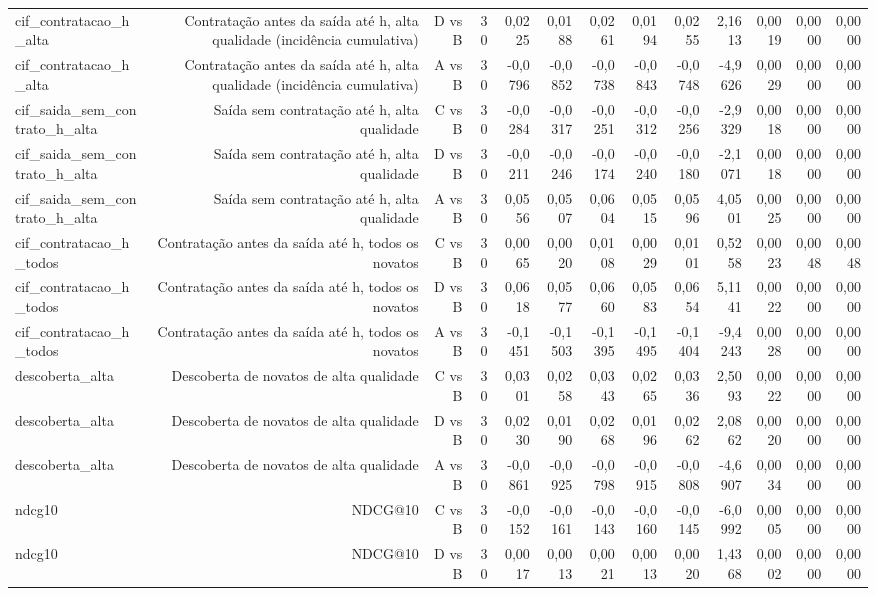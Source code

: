 \begin{table}[ht]
\begin{tabular}{lrrrrrrrrrrrr}
cif\_contratacao\_h\_alta & Contratação antes da saída até h, alta qualidade (incidência cumulativa) & D vs B & 30 & 0,0225 & 0,0188 & 0,0261 & 0,0194 & 0,0255 & 2,1613 & 0,0019 & 0,0000 & 0,0000 \\
cif\_contratacao\_h\_alta & Contratação antes da saída até h, alta qualidade (incidência cumulativa) & A vs B & 30 & -0,0796 & -0,0852 & -0,0738 & -0,0843 & -0,0748 & -4,9626 & 0,0029 & 0,0000 & 0,0000 \\
cif\_saida\_sem\_contrato\_h\_alta & Saída sem contratação até h, alta qualidade & C vs B & 30 & -0,0284 & -0,0317 & -0,0251 & -0,0312 & -0,0256 & -2,9329 & 0,0018 & 0,0000 & 0,0000 \\
cif\_saida\_sem\_contrato\_h\_alta & Saída sem contratação até h, alta qualidade & D vs B & 30 & -0,0211 & -0,0246 & -0,0174 & -0,0240 & -0,0180 & -2,1071 & 0,0018 & 0,0000 & 0,0000 \\
cif\_saida\_sem\_contrato\_h\_alta & Saída sem contratação até h, alta qualidade & A vs B & 30 & 0,0556 & 0,0507 & 0,0604 & 0,0515 & 0,0596 & 4,0501 & 0,0025 & 0,0000 & 0,0000 \\
cif\_contratacao\_h\_todos & Contratação antes da saída até h, todos os novatos & C vs B & 30 & 0,0065 & 0,0020 & 0,0108 & 0,0029 & 0,0101 & 0,5258 & 0,0023 & 0,0048 & 0,0048 \\
cif\_contratacao\_h\_todos & Contratação antes da saída até h, todos os novatos & D vs B & 30 & 0,0618 & 0,0577 & 0,0660 & 0,0583 & 0,0654 & 5,1141 & 0,0022 & 0,0000 & 0,0000 \\
cif\_contratacao\_h\_todos & Contratação antes da saída até h, todos os novatos & A vs B & 30 & -0,1451 & -0,1503 & -0,1395 & -0,1495 & -0,1404 & -9,4243 & 0,0028 & 0,0000 & 0,0000 \\
descoberta\_alta & Descoberta de novatos de alta qualidade & C vs B & 30 & 0,0301 & 0,0258 & 0,0343 & 0,0265 & 0,0336 & 2,5093 & 0,0022 & 0,0000 & 0,0000 \\
descoberta\_alta & Descoberta de novatos de alta qualidade & D vs B & 30 & 0,0230 & 0,0190 & 0,0268 & 0,0196 & 0,0262 & 2,0862 & 0,0020 & 0,0000 & 0,0000 \\
descoberta\_alta & Descoberta de novatos de alta qualidade & A vs B & 30 & -0,0861 & -0,0925 & -0,0798 & -0,0915 & -0,0808 & -4,6907 & 0,0034 & 0,0000 & 0,0000 \\
ndcg10 & NDCG@10 & C vs B & 30 & -0,0152 & -0,0161 & -0,0143 & -0,0160 & -0,0145 & -6,0992 & 0,0005 & 0,0000 & 0,0000 \\
ndcg10 & NDCG@10 & D vs B & 30 & 0,0017 & 0,0013 & 0,0021 & 0,0013 & 0,0020 & 1,4368 & 0,0002 & 0,0000 & 0,0000 \\

\end{tabular}
\end{table}
